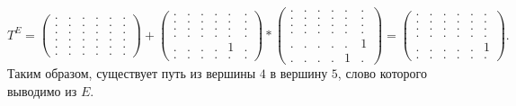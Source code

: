{
    \renewcommand{\arraystretch}{0.7}
    \setlength\arraycolsep{2pt}
\[
    T^E =
    \begin{pmatrix}
    . & . & . & . & . & . \\
    . & . & . & . & . & . \\
    . & . & . & . & . & . \\
    . & . & . & . & . & . \\
    . & . & . & . & . & . \\
    . & . & . & . & . & .
    \end{pmatrix} +
    \begin{pmatrix}
    . & . & . & . & . & . \\
    . & . & . & . & . & . \\
    . & . & . & . & . & . \\
    . & . & . & . & . & . \\
    . & . & . & . & 1 & . \\
    . & . & . & . & . & .
    \end{pmatrix} *
    \begin{pmatrix}
    . & . & . & . & . & . \\
    . & . & . & . & . & . \\
    . & . & . & . & . & . \\
    . & . & . & . & . & . \\
    . & . & . & . & . & 1 \\
    . & . & . & . & 1 & .
    \end{pmatrix} =
    \begin{pmatrix}
    . & . & . & . & . & . \\
    . & . & . & . & . & . \\
    . & . & . & . & . & . \\
    . & . & . & . & . & . \\
    . & . & . & . & . & 1 \\
    . & . & . & . & . & .
    \end{pmatrix}.
\]
}
Таким образом, существует путь из вершины $4$ в вершину $5$, слово которого выводимо из $E$.

